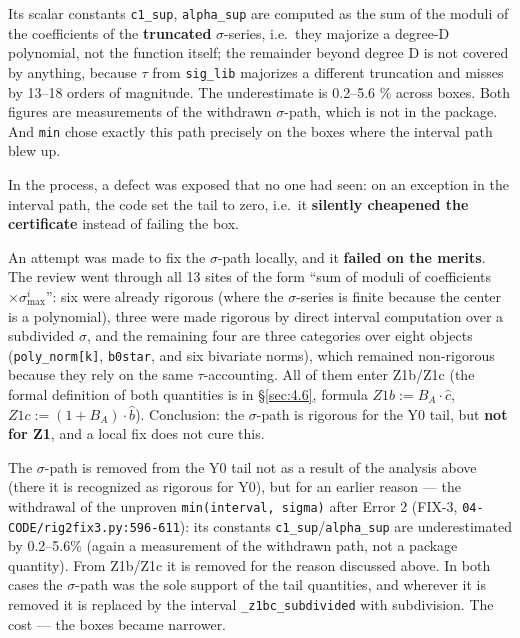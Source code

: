 \begin{remark}
Its scalar constants
\texttt{c1\_sup}, \texttt{alpha\_sup} are computed as the sum of the moduli of the
coefficients of the \textbf{truncated} $\sigma$-series, i.e.\ they majorize a
degree-D polynomial, not the function itself; the remainder beyond degree D
is not covered by anything, because $\tau$ from \texttt{sig\_lib} majorizes a different
truncation and misses by 13--18 orders of magnitude. The underestimate is
0.2--5.6 \% across boxes. Both figures are measurements of the withdrawn
$\sigma$-path, which is not in the package. And \texttt{min} chose exactly this path precisely on the
boxes where the interval path blew up.
\end{remark}

In the process, a defect was exposed that no one had seen: on an exception in the
interval path, the code set the tail to zero, i.e.\ it \textbf{silently cheapened
the certificate} instead of failing the box.

An attempt was made to fix the $\sigma$-path locally, and it \textbf{failed on the
merits}. The review went through all 13 sites of the form ``sum of moduli of
coefficients $\times \sigma_{\max}^i$'': six were already rigorous (where the $\sigma$-series is
finite because the center is a polynomial), three were made rigorous by
direct interval computation over a subdivided $\sigma$, and the remaining four are
three categories over eight objects (\texttt{poly\_norm[k]}, \texttt{b0star}, and six
bivariate norms), which remained non-rigorous because they rely on the same
$\tau$-accounting. All of them enter Z1b/Z1c (the formal definition of both
quantities is in \S\ref{sec:4.6}, formula $Z1b := B_A \cdot \hat{c}$, $Z1c := (1+B_A) \cdot \hat{b}$).
Conclusion: the $\sigma$-path is rigorous for the Y0 tail, but \textbf{not for Z1}, and a
local fix does not cure this.

The $\sigma$-path is removed from the Y0 tail not as a result of the analysis
above (there it is recognized as rigorous for Y0), but for an earlier
reason --- the withdrawal of the unproven \texttt{min(interval, sigma)} after Error 2
(FIX-3, \texttt{04-\allowbreak CODE/\allowbreak rig2fix3.py:596-611}): its constants \texttt{c1\_sup}/\texttt{alpha\_sup}
are underestimated by 0.2--5.6\% (again a measurement of the withdrawn path,
not a package quantity). From Z1b/Z1c it is removed for the reason
discussed above. In both cases the $\sigma$-path was the sole support of the tail
quantities, and wherever it is removed it is replaced by the interval
\texttt{\_\allowbreak z1bc\_\allowbreak subdivided} with subdivision. The cost --- the boxes became narrower.


